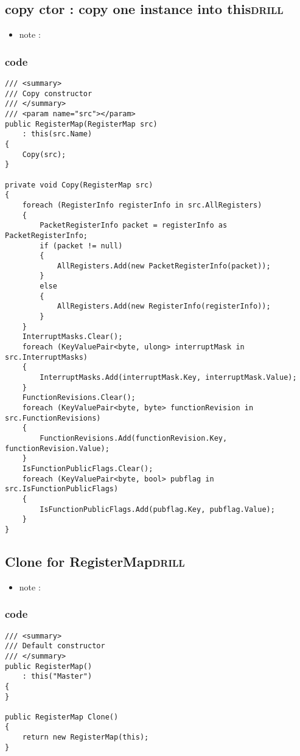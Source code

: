 \documentclass[11pt]{article}
\begin{document}
\subsection{copy ctor : copy one instance into this\hfill{}\textsc{drill}}
\label{sec:org3e0dc16}
\begin{itemize}
\item note :
\end{itemize}
\subsubsection{code}
\label{sec:org0d9914c}
\begin{verbatim}
/// <summary>
/// Copy constructor
/// </summary>
/// <param name="src"></param>
public RegisterMap(RegisterMap src)
    : this(src.Name)
{
    Copy(src);
}

private void Copy(RegisterMap src)
{
    foreach (RegisterInfo registerInfo in src.AllRegisters)
    {
        PacketRegisterInfo packet = registerInfo as PacketRegisterInfo;
        if (packet != null)
        {
            AllRegisters.Add(new PacketRegisterInfo(packet));
        }
        else
        {
            AllRegisters.Add(new RegisterInfo(registerInfo));
        }
    }
    InterruptMasks.Clear();
    foreach (KeyValuePair<byte, ulong> interruptMask in src.InterruptMasks)
    {
        InterruptMasks.Add(interruptMask.Key, interruptMask.Value);
    }
    FunctionRevisions.Clear();
    foreach (KeyValuePair<byte, byte> functionRevision in src.FunctionRevisions)
    {
        FunctionRevisions.Add(functionRevision.Key, functionRevision.Value);
    }
    IsFunctionPublicFlags.Clear();
    foreach (KeyValuePair<byte, bool> pubflag in src.IsFunctionPublicFlags)
    {
        IsFunctionPublicFlags.Add(pubflag.Key, pubflag.Value);
    }
}

\end{verbatim}

\subsection{Clone for RegisterMap\hfill{}\textsc{drill}}
\label{sec:org6f0e972}
\begin{itemize}
\item note :
\end{itemize}
\subsubsection{code}
\label{sec:org007c421}
\begin{verbatim}
/// <summary>
/// Default constructor
/// </summary>
public RegisterMap()
    : this("Master")
{
}

public RegisterMap Clone()
{
    return new RegisterMap(this);
}

\end{verbatim}
\end{document}
